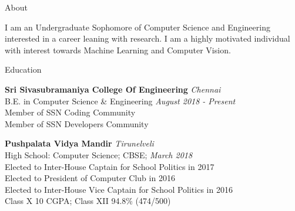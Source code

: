 \documentclass{resume} %
\begin{document}

\begin{rSection}{About}

I am an Undergraduate Sophomore of Computer Science and Engineering interested in a career leaning with research. I am a highly motivated individual with interest towards Machine Learning and Computer Vision. 

\end{rSection}



\begin{rSection}{Education}

{\bf Sri Sivasubramaniya College Of Engineering} \hfill {\em Chennai} \\ 
B.E. in Computer Science \& Engineering  \hfill {\em August 2018 - Present} \\ 
Member of SSN Coding Community\\
Member of SSN Developers Community

{\bf Pushpalata Vidya Mandir} \hfill {\em Tirunelveli} \\ 
High School: Computer Science; CBSE; \hfill {\em March 2018 } \\ 
Elected to Inter-House Captain for School Politics in 2017 \\
Elected to President of Computer Club in 2016 \\
Elected to Inter-House Vice Captain for School Politics in 2016 \\
Class X 10 CGPA; Class XII 94.8\% (474/500)  

\end{rSection}

\end{document}
